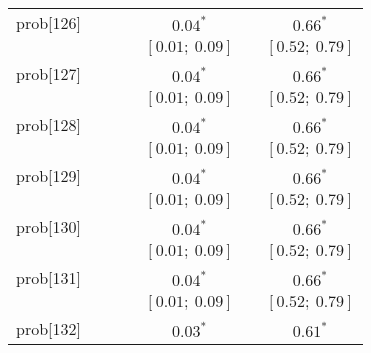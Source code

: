 \begin{table}
\begin{center}
\begin{tabular}{l c c c c c c }
prob[126] &                           &                           &                           & $0.04^{*}$              &                           & $0.66^{*}$            \\
          &                           &                           &                           & $[0.01;\ 0.09]$         &                           & $[0.52;\ 0.79]$       \\
prob[127] &                           &                           &                           & $0.04^{*}$              &                           & $0.66^{*}$            \\
          &                           &                           &                           & $[0.01;\ 0.09]$         &                           & $[0.52;\ 0.79]$       \\
prob[128] &                           &                           &                           & $0.04^{*}$              &                           & $0.66^{*}$            \\
          &                           &                           &                           & $[0.01;\ 0.09]$         &                           & $[0.52;\ 0.79]$       \\
prob[129] &                           &                           &                           & $0.04^{*}$              &                           & $0.66^{*}$            \\
          &                           &                           &                           & $[0.01;\ 0.09]$         &                           & $[0.52;\ 0.79]$       \\
prob[130] &                           &                           &                           & $0.04^{*}$              &                           & $0.66^{*}$            \\
          &                           &                           &                           & $[0.01;\ 0.09]$         &                           & $[0.52;\ 0.79]$       \\
prob[131] &                           &                           &                           & $0.04^{*}$              &                           & $0.66^{*}$            \\
          &                           &                           &                           & $[0.01;\ 0.09]$         &                           & $[0.52;\ 0.79]$       \\
prob[132] &                           &                           &                           & $0.03^{*}$              &                           & $0.61^{*}$            \\

\end{tabular}
\end{center}
\end{table}

